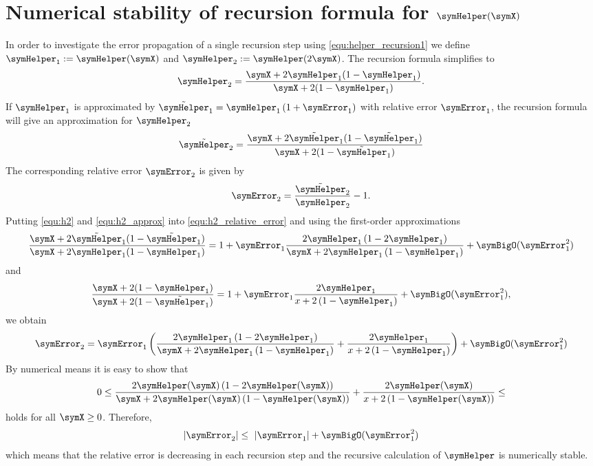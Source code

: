 \documentclass[a4paper]{scrartcl}
\begin{document}
\section{Numerical stability of recursion formula for $\symHelper(\symX)$}
\label{app:helper_stable}
In order to investigate the error propagation of a single recursion step using \eqref{equ:helper_recursion1} we define $\symHelper_1 := \symHelper(\symX)$ and $\symHelper_2 := \symHelper(2\symX)$. The recursion formula simplifies to
\begin{equation}
\label{equ:h2}
\symHelper_2 = \frac{\symX+2\symHelper_1(1-\symHelper_1)}{\symX+2(1-\symHelper_1)}.
\end{equation}
If $\symHelper_1$ is approximated by $\tilde{\symHelper}_1 = \symHelper_1\left(1+\symError_1\right)$ with relative error $\symError_1$, the recursion formula will give an approximation for $\symHelper_2$
\begin{equation}
\label{equ:h2_approx}
\tilde{\symHelper}_2 = 
\frac{\symX+2\tilde{\symHelper}_1(1-\tilde{\symHelper}_1)}{\symX+2(1-\tilde{\symHelper}_1)}
\end{equation}
The corresponding relative error $\symError_2$ is given by
\begin{equation}
\label{equ:h2_relative_error}
\symError_2 = \frac{\tilde{\symHelper}_2}{\symHelper_2}-1.
\end{equation}
Putting \eqref{equ:h2} and \eqref{equ:h2_approx} into \eqref{equ:h2_relative_error} and using the first-order approximations 
\begin{equation}
\frac{\symX+2\tilde{\symHelper}_1(1-\tilde{\symHelper}_1)}
{\symX+2\symHelper_1(1-\symHelper_1)}
=
1
+
\symError_1
\frac{2\symHelper_1\left(1-2\symHelper_1\right)}
{\symX + 2\symHelper_1\left(1-\symHelper_1\right)}
+\symBigO(\symError_1^2)
\end{equation}
and
\begin{equation}
\frac{\symX+2(1-\symHelper_1)}
{\symX+2(1-\tilde{\symHelper}_1)}
=
1
+
\symError_1
\frac{2\symHelper_1}{x+2\left(1-\symHelper_1\right)}
+\symBigO(\symError_1^2),
\end{equation}
we obtain
\begin{equation}
\symError_2
=
\symError_1
\left(
\frac{2\symHelper_1\left(1-2\symHelper_1\right)}
{\symX + 2\symHelper_1\left(1-\symHelper_1\right)}
+
\frac{2\symHelper_1}{x+2\left(1-\symHelper_1\right)}
\right)
+\symBigO(\symError_1^2)
\end{equation}
By numerical means it is easy to show that
\begin{equation}
0\leq\frac{2\symHelper(\symX)\left(1-2\symHelper(\symX)\right)}
{\symX + 2\symHelper(\symX)\left(1-\symHelper(\symX)\right)}
+
\frac{2\symHelper(\symX)}{x+2\left(1-\symHelper(\symX)\right)} \leq 
\end{equation}
holds for all $\symX \geq 0$. Therefore,
\begin{equation}
|\symError_2|\leq \  |\symError_1| + \symBigO(\symError_1^2)
\end{equation}
which means that the relative error is decreasing in each recursion step and the recursive calculation of $\symHelper$ is numerically stable.
\end{document}
